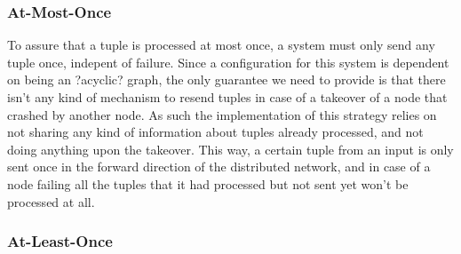 \documentclass[times, 10pt,twocolumn]{article}
\begin{document}
\subsubsection{At-Most-Once}

To assure that a tuple is processed at most once, a system must only send
any tuple once, indepent of failure. Since a configuration for this system
is dependent on being an ?acyclic? graph, the only guarantee we need to
provide is that there isn't any kind of mechanism to resend tuples in case
of a takeover of a node that crashed by another node.  As such the
implementation of this strategy relies on not sharing any kind of
information about tuples already processed, and not doing anything upon
the takeover. This way, a certain tuple from an input is only sent once in
the forward direction of the distributed network, and in case of a node
failing all the tuples that it had processed but not sent yet won't be
processed at all.

\subsubsection{At-Least-Once}
\end{document}
